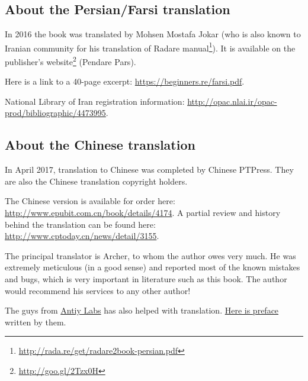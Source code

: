 \subsection*{About the Persian/Farsi translation}

In 2016 the book was translated by Mohsen Mostafa Jokar (who is also known to Iranian community for his translation of Radare manual\footnote{\url{http://rada.re/get/radare2book-persian.pdf}}).
It is available on the publisher’s website\footnote{\url{http://goo.gl/2Tzx0H}} (Pendare Pars).

Here is a link to a 40-page excerpt: \url{https://beginners.re/farsi.pdf}.

National Library of Iran registration information: \url{http://opac.nlai.ir/opac-prod/bibliographic/4473995}.

\subsection*{About the Chinese translation}

In April 2017, translation to Chinese was completed by Chinese PTPress. They are also the Chinese translation copyright holders.

 The Chinese version is available for order here: \url{http://www.epubit.com.cn/book/details/4174}. A partial review and history behind the translation can be found here: \url{http://www.cptoday.cn/news/detail/3155}.

The principal translator is Archer, to whom the author owes very much. He was extremely meticulous (in a good sense) and reported most of the known mistakes and bugs, which is very important in literature such as this book.
The author would recommend his services to any other author!

The guys from \href{http://www.antiy.net/}{Antiy Labs} has also helped with translation. \href{http://www.epubit.com.cn/book/onlinechapter/51413}{Here is preface} written by them.

